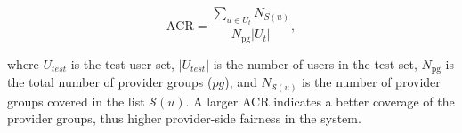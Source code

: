             \begin{equation}
                \text{ACR}=\frac{\sum_{u\in U_t}N_{S(u)}}{N_\text{pg}|U_t|},
            \end{equation}
            \vspace{0.25cm}
        
            where $U_{test}$ is the test user set, $|U_{test}|$ is the number of users in the test set, $N_\text{pg}$ is the total number of provider groups ($pg$), and $N_{\mathcal{S}(u)}$ is the number of provider groups covered in the list $\mathcal{S}(u)$. A larger ACR indicates a better coverage of the provider groups, thus higher provider-side fairness in the system.
        
        
        
        
        
        
        
        
